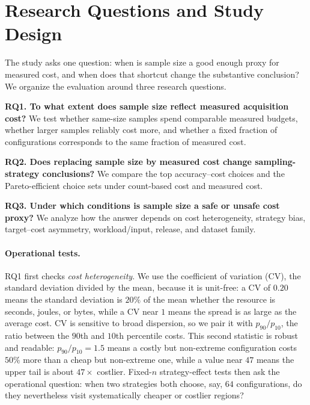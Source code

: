 \section{Research Questions and Study Design}
\label{sec:study_design}
\label{sec:experiment}

The study asks one question: when is sample size a good enough proxy for
measured cost, and when does that shortcut change the substantive
conclusion? We organize the evaluation around three research questions.

    \textbf{RQ1. To what extent does sample size reflect measured
    acquisition cost?} We test whether same-size samples spend comparable
    measured budgets, whether larger samples reliably cost more, and whether a
    fixed fraction of configurations corresponds to the same fraction of
    measured cost.
    
    \textbf{RQ2. Does replacing sample size by measured cost
    change sampling-strategy conclusions?} We compare the top accuracy--cost
    choices and the Pareto-efficient choice sets under count-based cost and
    measured cost.
    
    \textbf{RQ3. Under which conditions is sample size a safe or unsafe
    cost proxy?} We analyze how the answer depends on cost heterogeneity,
    strategy bias, target--cost asymmetry, workload/input, release, and dataset
    family.

\paragraph*{Operational tests.}
RQ1 first checks \emph{cost heterogeneity}. We use the coefficient of variation
(CV), the standard deviation divided by the mean, because it is unit-free: a
CV of $0.20$ means the standard deviation is $20\%$ of the mean whether the
resource is seconds, joules, or bytes, while a CV near $1$ means the spread is as
large as the average cost. CV is sensitive to broad dispersion, so we pair it
with $p_{90}/p_{10}$, the ratio between the $90$th and $10$th percentile costs.
This second statistic is robust and readable: $p_{90}/p_{10}=1.5$ means a
costly but non-extreme configuration costs $50\%$ more than a cheap but
non-extreme one, while a value near $47$ means the upper tail is about $47\times$
costlier. Fixed-$n$ strategy-effect tests then ask the operational question:
when two strategies both choose, say, $64$ configurations, do they nevertheless
visit systematically cheaper or costlier regions?


